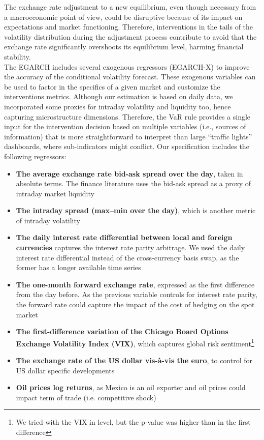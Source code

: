 \documentclass[11pt]{article}
\begin{document}
The exchange rate adjustment to a  new equilibrium, even though necessary from
a macroeconomic  point of view, could  be disruptive because of  its impact on
expectations and market functioning. Therefore,  interventions in the tails of
the volatility distribution during the  adjustment process contribute to avoid
that the exchange rate significantly overshoots its equilibrium level, harming
financial stability.\\

The EGARCH  includes several  exogenous regressors  (EGARCH-X) to  improve the
accuracy of the conditional volatility forecast. These exogenous variables can
be  used to  factor in  the  specifics of  a  given market  and customize  the
interventions  metrics. Although  our estimation  is based  on daily  data, we
incorporated some  proxies for  intraday volatility  and liquidity  too, hence
capturing microstructure dimensions. Therefore, the VaR rule provides a single
input for the intervention decision based on multiple variables (i.e., sources
of information) that is more  straightforward to interpret than large “traffic
lights”  dashboards, where  sub-indicators might  conflict. Our  specification
includes the following regressors:

\begin{itemize}
\item \textbf{The average exchange rate bid-ask spread over the day}, taken in
  absolute terms. The finance literature uses the bid-ask spread as a proxy of
  intraday market liquidity
\item \textbf{The intraday spread (max–min over the day)}, which is another
  metric of intraday volatility
\item \textbf{The daily  interest rate differential between  local and foreign
currencies} captures  the interest  rate parity arbitrage.  We used  the daily
interest rate  differential instead of  the cross-currency basis swap,  as the
former has a longer available time series
\item \textbf{The  one-month forward  exchange rate},  expressed as  the first
difference from the day before. As the previous variable controls for interest
rate parity, the forward rate could capture  the impact of the cost of hedging
on the spot market
\item \textbf{The first-difference variation of the Chicago Board Options Exchange Volatility Index (VIX)}, which captures
  global risk sentiment\footnote{We tried with the VIX in level, but the p-value was higher than in the first difference}
\item \textbf{The exchange rate of the US dollar vis-à-vis the euro}, to
  control for US dollar specific developments
\item \textbf{Oil prices log returns}, as Mexico is an oil exporter and oil prices could impact term of trade (i.e. competitive shock)
\end{itemize}
\end{document}
